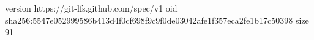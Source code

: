 version https://git-lfs.github.com/spec/v1
oid sha256:5547e052999586b413d4f0cf698f9c9f0de03042afe1f357eca2fe1b17c50398
size 91
